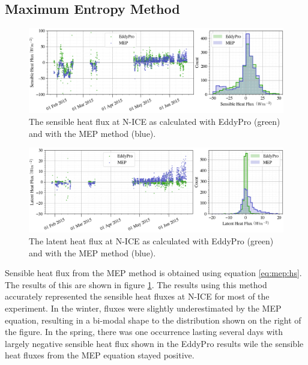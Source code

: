  \subsection{Maximum Entropy Method}

\begin{figure}[H]
    \centering
    \includegraphics[width=1\linewidth]{figures/chapter3/MEPSensible.png}
    \caption[Sensible heat flux from the MEP method compared to EddyPro]{The sensible heat flux at N-ICE as calculated with EddyPro (green) and with the MEP method (blue).}
    \label{fig:mep:sensible}
\end{figure}

\begin{figure}[H]
    \centering
    \includegraphics[width=1\linewidth]{figures/chapter3/MEPLatent.png}
    \caption[Latent heat flux from the MEP method compared to EddyPro]{The latent heat flux at N-ICE as calculated with EddyPro (green) and with the MEP method (blue).}
    \label{fig:mep:latent}
\end{figure}

Sensible heat flux from the MEP method is obtained using equation \ref{eq:mep:hs}. The results of this are shown in figure \ref{fig:mep:sensible}. The results using this method accurately represented the sensible heat fluxes at N-ICE for most of the experiment. In the winter, fluxes were slightly underestimated by the MEP equation, resulting in a bi-modal shape to the distribution shown on the right of the figure. In the spring, there was one occurrence lasting several days with largely negative sensible heat flux shown in the EddyPro results wile the sensible heat fluxes from the MEP equation stayed positive. 

